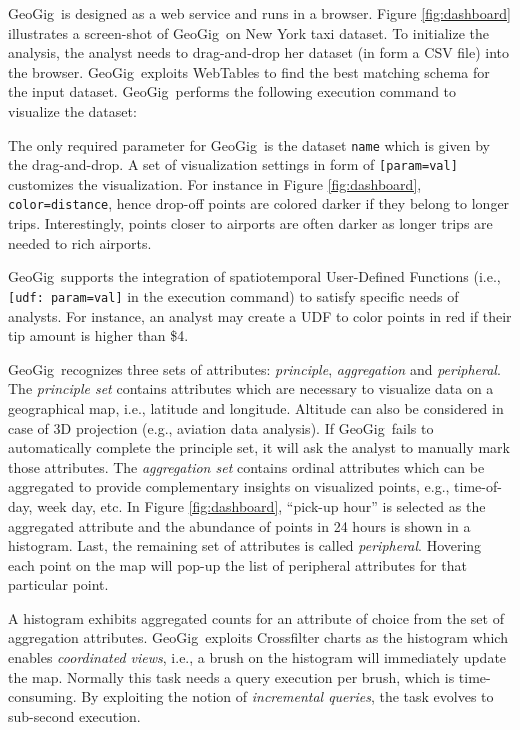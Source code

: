 \documentclass[conference]{IEEEtran}
\newcommand{\sys}{{\sc GeoGig}}
\begin{document}
\sys\ is designed as a web service and runs in a browser. Figure \ref{fig:dashboard} illustrates a screen-shot of \sys\ on New York taxi dataset. To initialize the analysis, the analyst needs to drag-and-drop her dataset (in form a CSV file) into the browser. \sys\ exploits {\sc WebTables} \cite{cafarella2008webtables} to find the best matching schema for the input dataset. \sys\ performs the following execution command to visualize the dataset:


The only required parameter for \sys\ is the dataset {\tt \small name} which is given by the drag-and-drop. A set of visualization settings in form of {\tt \small [param=val]} customizes the visualization. 
For instance in Figure \ref{fig:dashboard}, {\tt \small color=distance}, hence drop-off points are colored darker if they belong to longer trips. Interestingly, points closer to airports are often darker as longer trips are needed to rich airports.

\sys\ supports the integration of spatiotemporal User-Defined Functions (i.e., {\tt \small [udf: param=val]} in the execution command) to satisfy specific needs of analysts. For instance, an analyst may create a UDF to color points in red if their tip amount is higher than \$4.

\sys\ recognizes three sets of attributes: {\em principle}, {\em aggregation} and {\em peripheral}. The {\em principle set} contains attributes which are necessary to visualize data on a geographical map, i.e., latitude and longitude. Altitude can also be considered in case of 3D projection (e.g., aviation data analysis). If \sys\ fails to automatically complete the principle set, it will ask the analyst to manually mark those attributes. The {\em aggregation set} contains ordinal attributes which can be aggregated to provide complementary insights on visualized points, e.g., time-of-day, week day, etc. In Figure \ref{fig:dashboard}, ``pick-up hour'' is selected as the aggregated attribute and the abundance of points in 24 hours is shown in a histogram. Last, the remaining set of attributes is called {\em peripheral}. Hovering each point on the map will pop-up the list of peripheral attributes for that particular point.

A histogram exhibits aggregated counts for an attribute of choice from the set of aggregation attributes. \sys\ exploits Crossfilter charts \cite{cf} as the histogram which enables {\em coordinated views}, i.e., a brush on the histogram will immediately update the map. Normally this task needs a query execution per brush, which is time-consuming. By exploiting the notion of {\em incremental queries}, the task evolves to sub-second execution.
\end{document}
